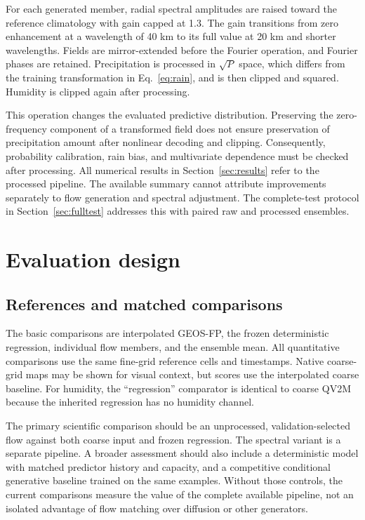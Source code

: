 \documentclass[10pt]{article}
\begin{document}
For each generated member, radial spectral amplitudes are raised toward the reference climatology with gain capped at 1.3. The gain transitions from zero enhancement at a wavelength of 40 km to its full value at 20 km and shorter wavelengths. Fields are mirror-extended before the Fourier operation, and Fourier phases are retained. Precipitation is processed in $\sqrt{P}$ space, which differs from the training transformation in Eq.~\eqref{eq:rain}, and is then clipped and squared. Humidity is clipped again after processing.

This operation changes the evaluated predictive distribution. Preserving the zero-frequency component of a transformed field does not ensure preservation of precipitation amount after nonlinear decoding and clipping. Consequently, probability calibration, rain bias, and multivariate dependence must be checked after processing. All numerical results in Section~\ref{sec:results} refer to the processed pipeline. The available summary cannot attribute improvements separately to flow generation and spectral adjustment. The complete-test protocol in Section~\ref{sec:fulltest} addresses this with paired raw and processed ensembles.

\section{Evaluation design}\label{sec:evaluation}
\subsection{References and matched comparisons}
The basic comparisons are interpolated GEOS-FP, the frozen deterministic regression, individual flow members, and the ensemble mean. All quantitative comparisons use the same fine-grid reference cells and timestamps. Native coarse-grid maps may be shown for visual context, but scores use the interpolated coarse baseline. For humidity, the ``regression'' comparator is identical to coarse QV2M because the inherited regression has no humidity channel.

The primary scientific comparison should be an unprocessed, validation-selected flow against both coarse input and frozen regression. The spectral variant is a separate pipeline. A broader assessment should also include a deterministic model with matched predictor history and capacity, and a competitive conditional generative baseline trained on the same examples. Without those controls, the current comparisons measure the value of the complete available pipeline, not an isolated advantage of flow matching over diffusion or other generators.
\end{document}
